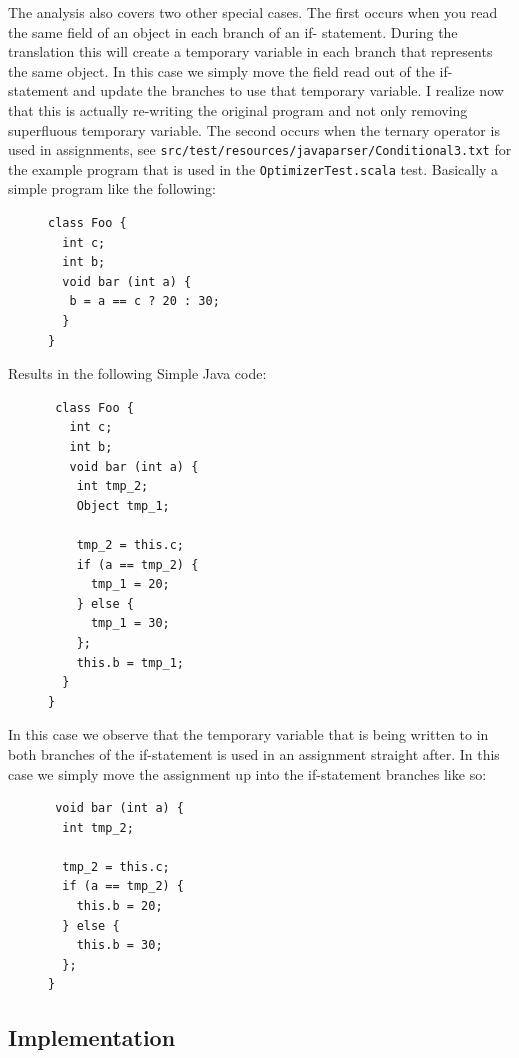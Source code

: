 \documentclass[11pt]{exam}
\begin{document}
The analysis also covers two other special cases. The first occurs
when you read the same field of an object in each branch of an if-
statement. During the translation this will create a temporary
variable in each branch that represents the same object. In this case
we simply move the field read out of the if-statement and update the
branches to use that temporary variable. I realize now that this is
actually re-writing the original program and not only removing
superfluous temporary variable. The second occurs when the ternary
operator is used in assignments, see \texttt{src/test/resources/javaparser/Conditional3.txt}
for the example program that is used in the \texttt{OptimizerTest.scala} test.
Basically a simple program like the following:

\begin{figure}[h!]
\begin{lstlisting}
class Foo {
  int c;
  int b;
  void bar (int a) {
   b = a == c ? 20 : 30;
  }
}
\end{lstlisting}
\end{figure}

Results in the following Simple Java code:

\begin{figure}[h!]
\begin{lstlisting}
 class Foo {
   int c;
   int b;
   void bar (int a) {
    int tmp_2;
    Object tmp_1;

    tmp_2 = this.c;
    if (a == tmp_2) {
      tmp_1 = 20;
    } else {
      tmp_1 = 30;
    };
    this.b = tmp_1;
  }
}
\end{lstlisting}
\end{figure}

In this case we observe that the temporary variable that is being written to in both
branches of the if-statement is used in an assignment straight after. In this
case we simply move the assignment up into the if-statement branches like so:

\begin{figure}[h!]
\begin{lstlisting}
 void bar (int a) {
  int tmp_2;

  tmp_2 = this.c;
  if (a == tmp_2) {
    this.b = 20;
  } else {
    this.b = 30;
  };
}
\end{lstlisting}
\end{figure}

\subsection{Implementation}
\end{document}
